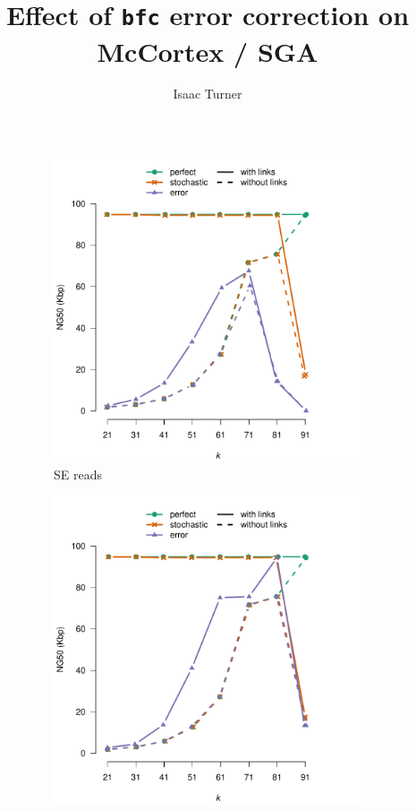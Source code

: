 \documentclass[a4paper]{article}
\title{Effect of \texttt{bfc} error correction on McCortex / SGA}
\author{Isaac Turner}
\begin{document}
\maketitle

\begin{figure}[H]
\centering
\begin{subfigure}{.45\textwidth}
\centering
\includegraphics[width=1\linewidth]{../plain-vs-links.pdf}
\caption{SE reads}
\end{subfigure}
\begin{subfigure}{.45\textwidth}
\centering
\includegraphics[width=1\linewidth]{../plain-vs-links-corr.pdf}

\end{subfigure}
\end{figure}
\end{document}
